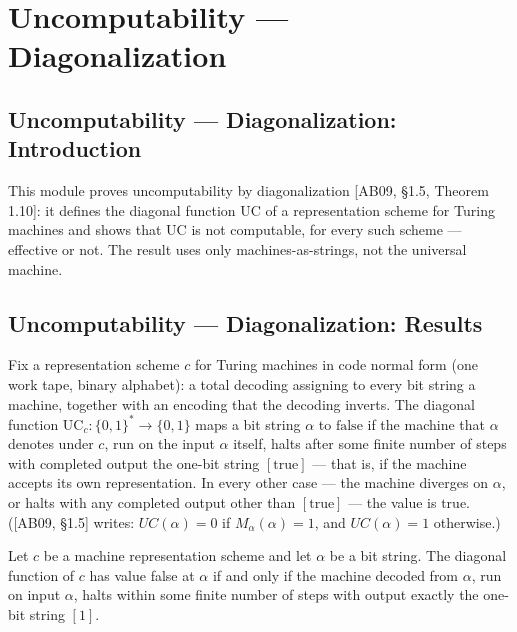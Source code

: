 \section{Uncomputability --- Diagonalization}
\subsection*{Uncomputability --- Diagonalization: Introduction}

This module proves uncomputability by diagonalization [AB09, \S 1.5,
Theorem 1.10]: it defines the diagonal function $\mathrm{UC}$ of a
representation scheme for Turing machines and shows that $\mathrm{UC}$ is not
computable, for every such scheme --- effective or not. The result uses only
machines-as-strings, not the universal machine.

\subsection*{Uncomputability --- Diagonalization: Results}

\begin{definition}
\label{Complexity.UC}
\leanok
{}
Fix a representation scheme $c$ for Turing machines in code normal form (one
work tape, binary alphabet): a total decoding assigning to every bit string a
machine, together with an encoding that the decoding inverts. The diagonal
function $\mathrm{UC}_c : \{0,1\}^* \to \{0,1\}$ maps a bit string $\alpha$ to
$\mathrm{false}$ if the machine that $\alpha$ denotes under $c$, run on the
input $\alpha$ itself, halts after some finite number of steps with completed
output the one-bit string $[\mathrm{true}]$ --- that is, if the machine accepts
its own representation. In every other case --- the machine diverges on
$\alpha$, or halts with any completed output other than $[\mathrm{true}]$ ---
the value is $\mathrm{true}$. ([AB09, \S 1.5] writes: $UC(\alpha) = 0$ if
$M_\alpha(\alpha) = 1$, and $UC(\alpha) = 1$ otherwise.)
\end{definition}

\begin{theorem}
\label{Complexity.UC_eq_false_iff}
\leanok
{}
Let $c$ be a machine representation scheme and let $\alpha$ be a bit string. The
diagonal function of $c$ has value false at $\alpha$ if and only if the machine decoded
from $\alpha$, run on input $\alpha$, halts within some finite number of steps with
output exactly the one-bit string $[1]$.
\end{theorem}


